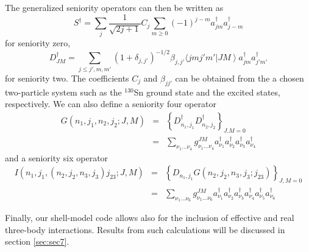 \documentclass[twoside,12pt]{article}
\begin{document}
The generalized seniority operators \cite{talmi} can then be written as 
\begin{equation}
    S^{\dagger}= \sum_{j}
    \frac{1}{\sqrt{2j+1}}C_{j}\sum_{m \geq 0} (-1)^{j-m} a^{\dagger}_{jm}
    a_{j-m}^{\dagger}
    \label{eq:zerosen}
\end{equation}
for seniority zero,
\begin{equation}
     D_{J M}^{\dagger}
         = \sum_{j \leq j', m,m'} (1+\delta_{j,j'})^{-1/2}
           \beta_{j,j'} \langle j m j' m'
           \left | J M \right \rangle a^{\dagger}_{jm}a^{\dagger}_{j' m'}
\label{eq:twosen}
\end{equation}
for seniority two. The coefficients $C_{j}$ and $\beta_{jj'}$ can be  obtained from the a chosen 
two-particle system such as the $^{130}$Sn
ground state and the excited states, respectively.
We can also define a
seniority four operator
\begin{eqnarray}
G(n_1,j_1, n_2,j_2; J,M)
      &=& \left \{D_{n_1,j_1}^{\dagger} D_{n_2,j_2}^{\dagger}
               \right \}_{J.M = 0}  \nonumber\\
      &=& \sum_{\nu_1 \ldots \nu_4} g_{\nu_1 \ldots \nu_4}^{JM}
           a_{\nu_1}^{\dagger}a_{\nu_2}^{\dagger}a_{\nu_3}^{\dagger}
                        a_{\nu_4}^{\dagger} 
%
  \end{eqnarray}
%
and  a seniority six operator
%
\begin{eqnarray}
I(n_1,j_1,(n_2,j_2,n_3,j_3)j_{23}; J,M)
        &=& \left \{ D_{n_1,j_1} G(n_2,j_2, n_3,j_3; j_{23})
              \right \}_{J,M = 0} \nonumber\\
        &=& \sum_{\nu_1 \ldots \nu_6} g_{\nu_1 \dots \nu_6}^{JM}
           a_{\nu_1}^{\dagger}a_{\nu_2}^{\dagger}a_{\nu_3}^{\dagger}
           a_{\nu_4}^{\dagger} a_{\nu_5}^{\dagger} a_{\nu_6}^{\dagger}
%
\end{eqnarray}

Finally, our shell-model code allows also for the inclusion
of effective and real three-body interactions. Results from such calculations
will be discussed in section \ref{sec:sec7}.
\end{document}
